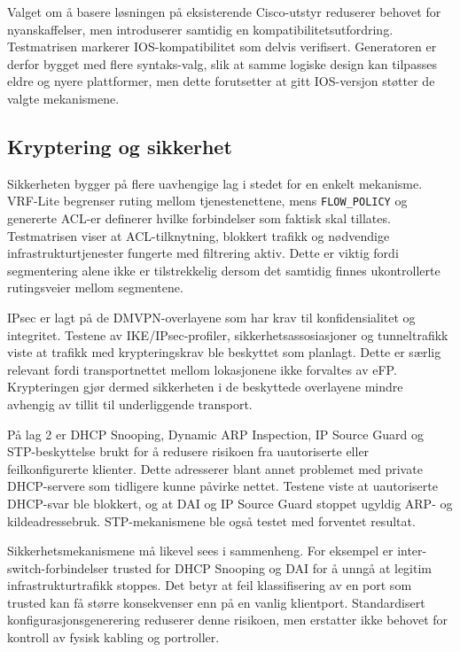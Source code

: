 Valget om å basere løsningen på eksisterende Cisco-utstyr reduserer behovet for nyanskaffelser, men introduserer samtidig en kompatibilitetsutfordring. Testmatrisen markerer IOS-kompatibilitet som delvis verifisert. Generatoren er derfor bygget med flere syntaks-valg, slik at samme logiske design kan tilpasses eldre og nyere plattformer, men dette forutsetter at gitt IOS-versjon støtter de valgte mekanismene.

\subsection{Kryptering og sikkerhet}

Sikkerheten bygger på flere uavhengige lag i stedet for en enkelt mekanisme. VRF-Lite begrenser ruting mellom tjenestenettene, mens \texttt{FLOW\_POLICY} og genererte ACL-er definerer hvilke forbindelser som faktisk skal tillates. Testmatrisen viser at ACL-tilknytning, blokkert trafikk og nødvendige infrastrukturtjenester fungerte med filtrering aktiv. Dette er viktig fordi segmentering alene ikke er tilstrekkelig dersom det samtidig finnes ukontrollerte rutingsveier mellom segmentene.

IPsec er lagt på de DMVPN-overlayene som har krav til konfidensialitet og integritet. Testene av IKE/IPsec-profiler, sikkerhetsassosiasjoner og tunneltrafikk viste at trafikk med krypteringskrav ble beskyttet som planlagt. Dette er særlig relevant fordi transportnettet mellom lokasjonene ikke forvaltes av eFP. Krypteringen gjør dermed sikkerheten i de beskyttede overlayene mindre avhengig av tillit til underliggende transport.

På lag 2 er DHCP Snooping, Dynamic ARP Inspection, IP Source Guard og STP-beskyttelse brukt for å redusere risikoen fra uautoriserte eller feilkonfigurerte klienter. Dette adresserer blant annet problemet med private DHCP-servere som tidligere kunne påvirke nettet. Testene viste at uautoriserte DHCP-svar ble blokkert, og at DAI og IP Source Guard stoppet ugyldig ARP- og kildeadressebruk. STP-mekanismene ble også testet med forventet resultat.

Sikkerhetsmekanismene må likevel sees i sammenheng. For eksempel er inter-switch-forbindelser trusted for DHCP Snooping og DAI for å unngå at legitim infrastrukturtrafikk stoppes. Det betyr at feil klassifisering av en port som trusted kan få større konsekvenser enn på en vanlig klientport. Standardisert konfigurasjonsgenerering reduserer denne risikoen, men erstatter ikke behovet for kontroll av fysisk kabling og portroller.

